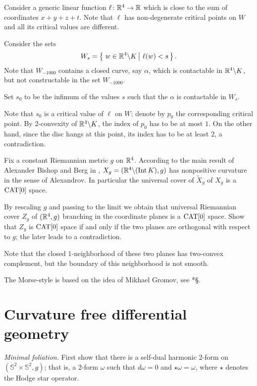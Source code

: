 Consider a generic linear function $\ell\colon\mathbb{R}^4\to\mathbb{R}$
which is close to the sum of coordinates $x+y+z+t$.
Note that $\ell$
has non-degenerate critical points on $W$ and all its critical values are different.

Consider the sets 
$$W_s=\set{w\in \RR^4\backslash K}{\ell(w)<s}.$$
Note that $W_{-1000}$ contains a closed curve, say $\alpha$, 
which is contactable in $\mathbb{R}^4\backslash K$, 
but not constructable in the set $W_{-1000}$.

Set $s_0$ to be the infimum of the values $s$ such that
the $\alpha$ is contactable in $W_s$.

Note that $s_0$ is a critical value of $\ell$ on $W$;
denote by $p_0$ the corresponding critical point.
By 2-convexity of $\mathbb{R}^4\backslash K$,
the index of $p_0$ has to be at most $1$.
On the other hand, since the disc hangs at this point,
its index has to be at least $2$,
 a contradiction.

Fix a constant Riemannian metric $g$ on $\mathbb{R}^4$.
According to the main result of Alexander Bishop and Berg in \cite{ABB}, $X_g=(\mathbb{R}^4\backslash (\operatorname{\rm Int}\nolimits K),g)$ has nonpositive curvature in the sense of Alexandrov.
In particular the universal cover of $\tilde X_g$ of $X_g$ is a $\operatorname{\rm CAT}\nolimits[0]$ space.

By rescaling $g$ and passing to the limit we obtain that universal Riemannian cover $Z_g$ of $(\mathbb{R}^4,g)$ branching in the coordinate planes is a $\operatorname{\rm CAT}\nolimits[0]$ space.
Show that $Z_g$ is $\operatorname{\rm CAT}\nolimits[0]$ space if and only if the two planes are orthogonal with respect to $g$;
the later leads to a contradiction.

Note that the closed $1$-neighborhood of these two planes has two-convex complement, but the boundary of this neighborhood is not smooth.

The Morse-style is based on the idea of Mikhael Gromov, see \cite{gromov-SGMC}*{\S\textonehalf}.

\section*{Curvature free differential geometry}

\textit{Minimal foliation.}
First show that there is a self-dual harmonic 2-form on $(\mathbb{S}^2\times\mathbb{S}^2,g)$;
that is, a 2-form $\omega$ such that $d\omega=0$ and $\star\omega=\omega$,
where $\star$ denotes the Hodge star operator.

